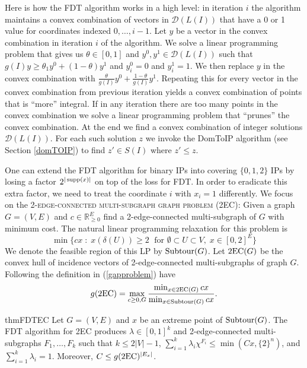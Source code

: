 Here is how the FDT algorithm works in a high level: in iteration $i$ the algorithm maintains a convex combination of  vectors in $\mathcal{D}(L(I))$ that have a 0 or 1 value for coordinates indexed $0,\ldots,i-1$. Let $y$ be a vector in the convex combination in iteration $i$ of the algorithm. We solve a linear programming problem that gives us $\theta\in [0,1]$ and $y^0,y^1\in \mathcal{D}(L(I))$ such that $g(I) y\geq \theta_1y^0 + (1-\theta) y^1$ and $y^0_i=0$ and $y^1_i=1$. We then replace $y$ in the convex combination with $\frac{\theta}{g(I)}y^0 +\frac{1-\theta}{g(I)}y^1$. Repeating this for every vector in the convex combination from previous iteration yields a convex combination  of points that is ``more'' integral. If in any iteration there are too many points in the convex combination we solve a linear programming problem that ``prunes'' the convex combination. At the end we find a convex combination of integer solutions $\mathcal{D}(L(I))$. For each such solution $z$ we invoke the DomToIP algorithm (see Section \ref{domTOIP}) to find $z'\in S(I)$ where $z'\leq z$.


One can extend the FDT algorithm for binary IPs into covering $\{0,1,2\}$ IPs by losing a factor $2^{|\operatorname{supp}(x)|}$ on top of the loss for FDT. In order to eradicate this extra factor, we need to treat the coordinate $i$ with $x_i=1$ differently. We focus on the \textsc{2-edge-connected multi-subgraph graph problem (2EC)}: Given a graph $G=(V,E)$ and $c\in \mathbb{R}^{E}_{\geq 0}$ find a 2-edge-connected multi-subgraph of $G$ with minimum cost. The natural linear programming relaxation for this problem is 
\begin{equation}
\min \{cx \; : \; x(\delta(U))\geq 2 \; \text{ for }\emptyset \subset U \subset V, \; x\in [0,2]^E\}
\end{equation}
We denote the feasible region of this LP by $\operatorname{{Subtour}}(G)$. Let $\2ec(G)$ be the convex hull of incidence vectors of 2-edge-connected multi-subgraphs of graph $G$. Following the definition in (\ref{gapproblem}) have
\begin{equation}
g(\2ec) = \max_{c\geq 0 , G}\frac{\min_{x\in \2ec(G)} cx}{\min_{x\in \subtour(G)} cx}.
\end{equation}

\begin{restatable}{thm}{FDTEC}
	\label{FDT2EC}
	Let $G=(V,E)$ and $x$ be an extreme point of  $\operatorname{{Subtour}}(G)$. The FDT algorithm for 2EC produces $\lambda\in [0,1]^k$ and 2-edge-connected multi-subgraphs $F_1,\ldots,F_k$ such that $k\leq 2|V|-1$, $\sum_{i=1}^{k}\lambda_i \chi^{F_i}\leq \min(Cx,\{2\}^n)$, and $\sum_{i=1}^{k}\lambda_i = 1$. Moreover, $C\leq g(\2ec)^{|E_x|}$.
\end{restatable}

